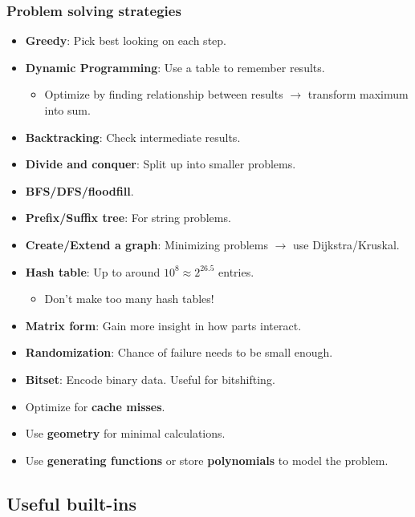 \subsubsection{Problem solving strategies}
\begin{itemize}
    \item \textbf{Greedy}: Pick best looking on each step.
    \item \textbf{Dynamic Programming}: Use a table to remember results.
    \begin{itemize}
        \item Optimize by finding relationship between results $\rightarrow$ transform maximum into sum.
    \end{itemize}
    \item \textbf{Backtracking}: Check intermediate results.
    \item \textbf{Divide and conquer}: Split up into smaller problems.
    \item \textbf{BFS/DFS/floodfill}.
    \item \textbf{Prefix/Suffix tree}: For string problems.
    \item \textbf{Create/Extend a graph}: Minimizing problems $\rightarrow$ use Dijkstra/Kruskal.
    \item \textbf{Hash table}: Up to around $10^8 \approx 2^{26.5}$ entries.
    \begin{itemize}
        \item Don't make too many hash tables!
    \end{itemize}
    \item \textbf{Matrix form}: Gain more insight in how parts interact.
    \item \textbf{Randomization}: Chance of failure needs to be small enough.
    \item \textbf{Bitset}: Encode binary data. Useful for bitshifting.
    \item Optimize for \textbf{cache misses}.
    \item Use \textbf{geometry} for minimal calculations.
    \item Use \textbf{generating functions} or store \textbf{polynomials} to model the problem.
\end{itemize}



\subsection{Useful built-ins}


